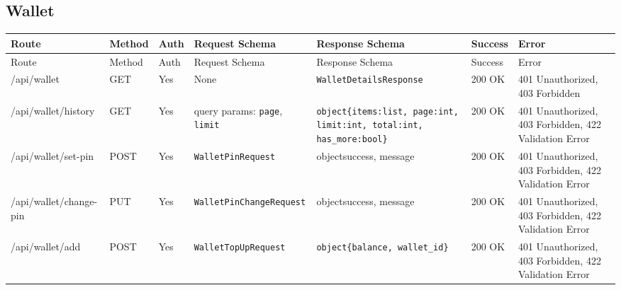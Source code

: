 \subsection{Wallet}
\begin{longtable}{p{3.2cm} p{1.7cm} p{2.2cm} p{3.6cm} p{3.6cm} p{1.8cm} p{1.8cm}}
\toprule
Route & Method & Auth & Request Schema & Response Schema & Success & Error \\
\midrule
\endfirsthead
\toprule
Route & Method & Auth & Request Schema & Response Schema & Success & Error \\
\midrule
\endhead
\bottomrule
\endfoot

/api/wallet & GET & Yes & None & \texttt{WalletDetailsResponse} & 200 OK & 401 Unauthorized, 403 Forbidden \\

/api/wallet/history & GET & Yes & query params: \texttt{page}, \texttt{limit} & \texttt{object\{items:list, page:int, limit:int, total:int, has\_more:bool\}} & 200 OK & 401 Unauthorized, 403 Forbidden, 422 Validation Error \\

/api/wallet/set-pin & POST & Yes & \texttt{WalletPinRequest} & object{success, message} & 200 OK & 401 Unauthorized, 403 Forbidden, 422 Validation Error \\

/api/wallet/change-pin & PUT & Yes & \texttt{WalletPinChangeRequest} & object{success, message} & 200 OK & 401 Unauthorized, 403 Forbidden, 422 Validation Error \\

/api/wallet/add & POST & Yes & \texttt{WalletTopUpRequest} & \texttt{object\{balance, wallet\_id\}} & 200 OK & 401 Unauthorized, 403 Forbidden, 422 Validation Error \\
\end{longtable}

